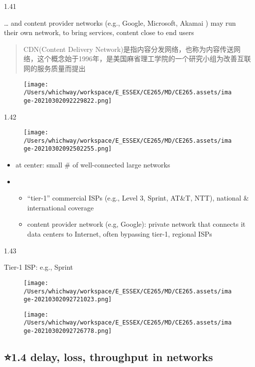 \documentclass[
]{article}
\begin{document}
1.41

\ldots{} and content provider networks (e.g., Google, Microsoft, Akamai
) may run their own network, to bring services, content close to end
users

\begin{quote}
CDN(Content Delivery
Network)是指内容分发网络，也称为内容传送网络，这个概念始于1996年，是美国麻省理工学院的一个研究小组为改善互联网的服务质量而提出
\end{quote}

\begin{figure}
\centering
\texttt{[image: /Users/whichway/workspace/E\_ESSEX/CE265/MD/CE265.assets/image-20210302092229822.png]}
\caption{}
\end{figure}

1.42

\begin{figure}
\centering
\texttt{[image: /Users/whichway/workspace/E\_ESSEX/CE265/MD/CE265.assets/image-20210302092502255.png]}
\caption{}
\end{figure}

\begin{itemize}
\item
  at center: small \# of well-connected large networks
\item
  \begin{itemize}
  \item
    ``tier-1'' commercial ISPs (e.g., Level 3, Sprint, AT\&T, NTT),
    national \& international coverage
  \item
    content provider network (e.g, Google): private network that
    connects it data centers to Internet, often bypassing tier-1,
    regional ISPs
  \end{itemize}
\end{itemize}

1.43

Tier-1 ISP: e.g., Sprint

\begin{figure}
\centering
\texttt{[image: /Users/whichway/workspace/E\_ESSEX/CE265/MD/CE265.assets/image-20210302092721023.png]}
\caption{}
\end{figure}

\begin{figure}
\centering
\texttt{[image: /Users/whichway/workspace/E\_ESSEX/CE265/MD/CE265.assets/image-20210302092726778.png]}
\caption{}
\end{figure}

\hypertarget{14-delay-loss-throughput-in-networks}{%
\subsection{⭐️1.4 delay, loss, throughput in
networks}\label{14-delay-loss-throughput-in-networks}}
\end{document}
